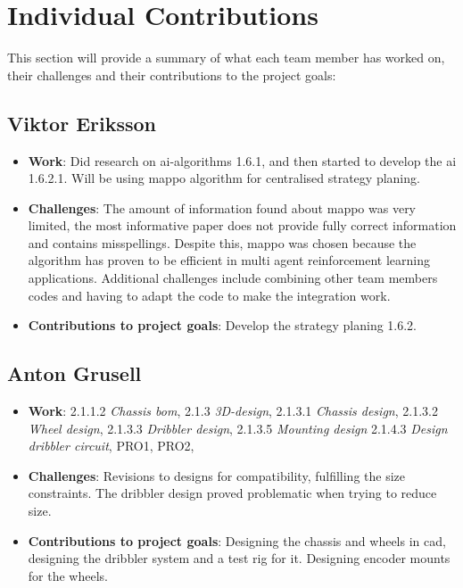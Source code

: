 \section{Individual Contributions}


This section will provide a summary of what each team member has worked on, their challenges and their contributions to the project goals:
\subsection*{Viktor Eriksson}
\begin{itemize}
    \item \textbf{Work}: Did research on \ac{ai}-algorithms 1.6.1, and then started to develop the \ac{ai} 1.6.2.1. Will be using \acf{mappo} algorithm for centralised strategy planing.
    \item \textbf{Challenges}: The amount of information found about \ac{mappo} was very limited, the most informative paper does not provide fully correct information and contains misspellings. Despite this, \ac{mappo} was chosen because the algorithm has proven to be efficient in multi agent reinforcement learning applications. Additional challenges include combining other team members codes and having to adapt the code to make the integration work.
    \item \textbf{Contributions to project goals}: Develop the strategy planing 1.6.2.
\end{itemize}
\subsection*{Anton Grusell}
\begin{itemize}
    \item \textbf{Work}: 2.1.1.2 \textit{Chassis \acs{bom}}, 2.1.3 \textit{3D-design}, 2.1.3.1 \textit{Chassis design}, 2.1.3.2 \textit{Wheel design}, 2.1.3.3 \textit{Dribbler design}, 2.1.3.5 \textit{Mounting design} 2.1.4.3 \textit{Design dribbler circuit}, PRO1, PRO2, 
    \item \textbf{Challenges}: Revisions to designs for compatibility, fulfilling the size constraints. The dribbler design proved problematic when trying to reduce size.
    \item \textbf{Contributions to project goals}: Designing the chassis and wheels in \ac{cad}, designing the dribbler system and a test rig for it. Designing encoder mounts for the wheels. 
\end{itemize}
